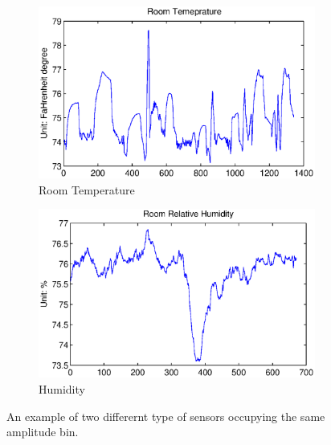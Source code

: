 \begin{figure}[ht!]
\centering
  \begin{subfigure}{0.22\textwidth}
                \centering
    \includegraphics[width=\textwidth]{./fig/rmt_ex.eps}
                \caption{Room Temperature}
  \end{subfigure}
  \begin{subfigure}{0.22\textwidth}
                \centering
    \includegraphics[width=\textwidth]{./fig/rh_ex.eps}
                \caption{Humidity}
  \end{subfigure}
\caption{An example of two differernt type of sensors occupying the same amplitude bin.}
\label{fig:same_bin}
\end{figure}


